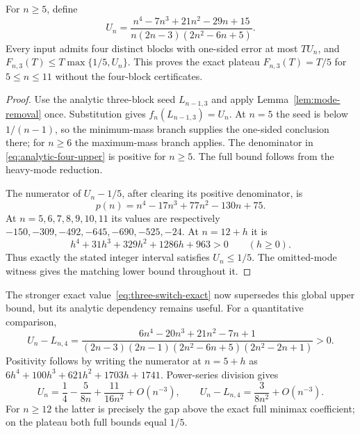 \begin{proposition}
\label{prop:analytic-four-upper}
For $n\ge5$, define
\begin{equation}\label{eq:analytic-four-upper}
 U_n=\frac{n^4-7n^3+21n^2-29n+15}
 {n(2n-3)(2n^2-6n+5)}.
\end{equation}
Every input admits four distinct blocks with one-sided error at most
$TU_n$, and $F_{n,3}(T)\le T\max\{1/5,U_n\}$.
This proves the exact plateau $F_{n,3}(T)=T/5$ for $5\le n\le11$
without the four-block certificates.
\end{proposition}
\begin{proof}
Use the analytic three-block seed $L_{n-1,3}$ and apply
Lemma~\ref{lem:mode-removal} once. Substitution gives
$f_n(L_{n-1,3})=U_n$. At $n=5$ the seed is below $1/(n-1)$,
so the minimum-mass branch supplies the one-sided conclusion there;
for $n\ge6$ the maximum-mass branch applies. The denominator in
\eqref{eq:analytic-four-upper} is positive for $n\ge5$.
The full bound follows from the heavy-mode reduction.

The numerator of $U_n-1/5$, after clearing its positive denominator, is
\[
 p(n)=n^4-17n^3+77n^2-130n+75.
\]
At $n=5,6,7,8,9,10,11$ its values are respectively
$-150,-309,-492,-645,-690,-525,-24$. At $n=12+h$ it is
\[
 h^4+31h^3+329h^2+1286h+963>0\qquad(h\ge0).
\]
Thus exactly the stated integer interval satisfies $U_n\le1/5$.
The omitted-mode witness gives the matching lower bound throughout it.
\end{proof}

The stronger exact value~\eqref{eq:three-switch-exact} now supersedes
this global upper bound, but its analytic dependency remains useful.
For a quantitative comparison,
\begin{equation}\label{eq:analytic-four-gap}
 U_n-L_{n,4}=
 \frac{6n^4-20n^3+21n^2-7n+1}
 {(2n-3)(2n-1)(2n^2-6n+5)(2n^2-2n+1)}>0.
\end{equation}
Positivity follows by writing the numerator at $n=5+h$ as
$6h^4+100h^3+621h^2+1703h+1741$. Power-series division gives
\[
 U_n=\frac14-\frac5{8n}+\frac{11}{16n^2}+O(n^{-3}),\qquad
 U_n-L_{n,4}=\frac3{8n^2}+O(n^{-3}).
\]
For $n\ge12$ the latter is precisely the gap above the exact full
minimax coefficient; on the plateau both full bounds equal $1/5$.

